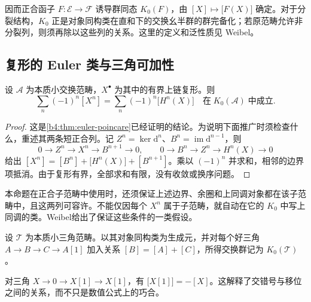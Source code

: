 因而正合函子 \(F:\mathcal E\rightarrow\mathcal F\) 诱导群同态 \(K_0(F)\)，由 \([X]\mapsto\bigl[F(X)\bigr]\) 确定。对于分裂结构，\(K_0\) 正是对象同构类在直和下的交换幺半群的群完备化；若原范畴允许非分裂列，则须再除以这些列的关系。这里的定义和泛性质见 Weibel\cite[Chapter II, Definition 7.1]{Weibel2013KBook}。

\subsection{复形的 Euler 类与三角可加性}
\label{b4:subsec:B02:02}

\begin{proposition}\label{b4:prop:B-euler-cohomology}
	设 \(\mathcal A\) 为本质小交换范畴，\(X^\bullet\) 为其中的有界上链复形。则
	\[
		\sum_n(-1)^n[X^n]=\sum_n(-1)^n\bigl[H^n(X)\bigr] \quad\text{在}\;K_0(\mathcal A)\;\text{中成立}.
	\]
\end{proposition}
\begin{proof}
	这是\cref{b4:thm:euler-poincare}已经证明的结论。为说明下面推广时须检查什么，重述其两条短正合列。记 \(Z^n=\ker \mathrm{d}^n\)、\(B^n=\operatorname{im}\mathrm{d}^{n-1}\)，则
	\[
		0\rightarrow Z^n\rightarrow X^n\rightarrow B^{n+1}\rightarrow0, \qquad 0\rightarrow B^n\rightarrow Z^n\rightarrow H^n(X)\rightarrow0
	\]
	给出 \([X^n]=[B^n]+\bigl[H^n(X)\bigr]+[B^{n+1}]\)。乘以 \((-1)^n\) 并求和，相邻的边界项抵消。由于复形有界，全部求和有限，没有收敛或换序问题。
\end{proof}

本命题在正合子范畴中使用时，还须保证上述边界、余圈和上同调对象都在该子范畴中，且这两列可容许。不能仅因每个 \(X^n\) 属于子范畴，就自动在它的 \(K_0\) 中写上同调的类。Weibel\cite[Chapter II, Proposition 7.5 and Corollary 7.5.1]{Weibel2013KBook}给出了保证这些条件的一类假设。

\begin{definition}\label{b4:def:B-triangulated-k0}
	设 \(\mathcal T\) 为本质小三角范畴。以其对象同构类为生成元，并对每个好三角 \(A\rightarrow B\rightarrow C\rightarrow A[1]\) 加入关系 \([B]=[A]+[C]\)，所得交换群记为 \(K_0(\mathcal T)\)。
\end{definition}

对三角 \(X\rightarrow0\rightarrow X[1]\rightarrow X[1]\)，有 \(\bigl[X[1]\bigr]=-[X]\)。这解释了交错号与移位之间的关系，而不只是数值公式上的巧合。

